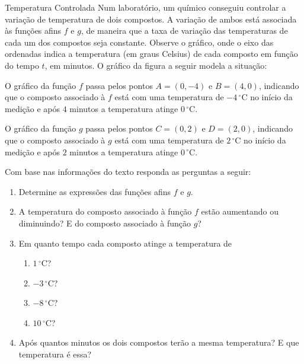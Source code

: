 \begin{task}{Temperatura Controlada}
\label{\detokenize{AF107-6:atividade-temperatura-controlada}}\label{\detokenize{AF107-6:id2}}
Num laboratório, um químico conseguiu controlar a variação de temperatura de dois compostos. A variação de ambos está associada às funções afins \(f\) e \(g\), de maneira que a taxa de variação das temperaturas de cada um dos compostos seja constante. Observe o gráfico, onde o eixo das ordenadas indica a temperatura (em graus Celsius) de cada composto em função do tempo \(t\), em minutos. O gráfico da figura a seguir modela a situação:

O gráfico da função \(f\) passa pelos pontos \(A=(0,-4)\) e \(B=(4,0)\), indicando que o composto associado à \(f\) está com uma temperatura de \(-4\,^{\circ}\mathrm{C}\) no início da medição e após \(4\) minutos a temperatura atinge \(0\,^{\circ}\mathrm{C}\).

O gráfico da função \(g\) passa pelos pontos \(C=(0,2)\) e \(D=(2,0)\), indicando que o composto associado à \(g\) está com uma temperatura de \(2\,^{\circ}\mathrm{C}\) no início da medição e após \(2\) minutos a temperatura atinge \(0\,^{\circ}\mathrm{C}\).

Com base nas informações do texto responda as perguntas a seguir:
\begin{enumerate}
\item {} 
Determine as expressões das funções afins \(f\) e \(g\).

\item {} 
A temperatura do composto associado à função \(f\) estão aumentando ou diminuindo? E do composto associado à função \(g\)?

\item {} 
Em quanto tempo cada composto atinge a temperatura de

\begin{enumerate}
\item \(1\,^{\circ}\mathrm{C}\)?

\item \(-3\,^{\circ}\mathrm{C}\)?

\item \(-8\,^{\circ}\mathrm{C}\)?

\item \(10\,^{\circ}\mathrm{C}\)?
\end{enumerate}
\item {} 
Após quantos minutos os dois compostos terão a mesma temperatura? E que temperatura é essa?

\end{enumerate}
\end{task}


